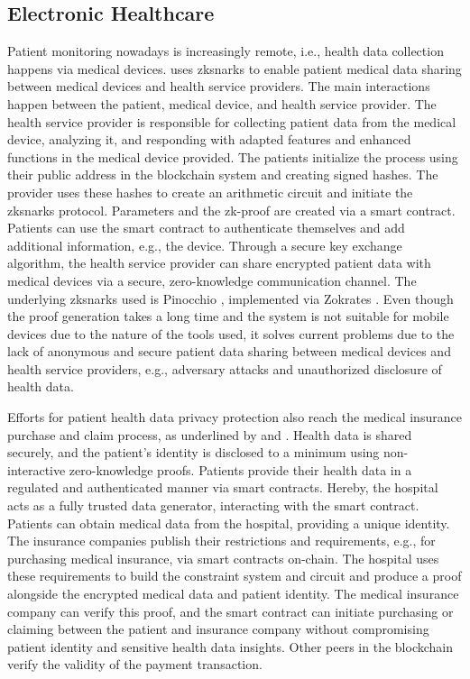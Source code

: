 \subsection{Electronic Healthcare}
Patient monitoring nowadays is increasingly remote, i.e., health data collection happens via medical devices. \citet{LuongPark} uses \acrshort{zksnark}s to enable patient medical data sharing between medical devices and health service providers. The main interactions happen between the patient, medical device, and health service provider. The health service provider is responsible for collecting patient data from the medical device, analyzing it, and responding with adapted features and enhanced functions in the medical device provided. The patients initialize the process using their public address in the blockchain system and creating signed hashes. The provider uses these hashes to create an arithmetic circuit and initiate the \acrshort{zksnark}s protocol. Parameters and the zk-proof are created via a smart contract. Patients can use the smart contract to authenticate themselves and add additional information, e.g., the device. Through a secure key exchange algorithm, the health service provider can share encrypted patient data with medical devices via a secure, zero-knowledge communication channel. The underlying \acrshort{zksnark}s used is Pinocchio \citep{Pinocchio}, implemented via Zokrates \citep{ZoKrates}. Even though the proof generation takes a long time and the system is not suitable for mobile devices due to the nature of the tools used, it solves current problems due to the lack of anonymous and secure patient data sharing between medical devices and health service providers, e.g., adversary attacks and unauthorized disclosure of health data.

Efforts for patient health data privacy protection also reach the medical insurance purchase and claim process, as underlined by \citet{ZHENG} and \citet{WangEtAl}. Health data is shared securely, and the patient's identity is disclosed to a minimum using non-interactive zero-knowledge proofs. Patients provide their health data in a regulated and authenticated manner via smart contracts. Hereby, the hospital acts as a fully trusted data generator, interacting with the smart contract. Patients can obtain medical data from the hospital, providing a unique identity. The insurance companies publish their restrictions and requirements, e.g., for purchasing medical insurance, via smart contracts on-chain. The hospital uses these requirements to build the constraint system and circuit and produce a proof alongside the encrypted medical data and patient identity. The medical insurance company can verify this proof, and the smart contract can initiate purchasing or claiming between the patient and insurance company without compromising patient identity and sensitive health data insights. Other peers in the blockchain verify the validity of the payment transaction.

